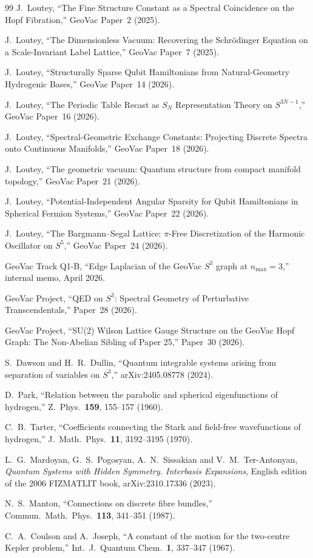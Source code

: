 \documentclass[aps,pra,twocolumn,superscriptaddress,longbibliography]{revtex4-2}
\begin{document}
\begin{thebibliography}{99}
J.~Loutey, ``The Fine Structure Constant as a Spectral Coincidence on
the Hopf Fibration,'' GeoVac Paper~2 (2025).

J.~Loutey, ``The Dimensionless Vacuum: Recovering the Schr\"odinger
Equation on a Scale-Invariant Label Lattice,'' GeoVac Paper~7 (2025).

J.~Loutey, ``Structurally Sparse Qubit Hamiltonians from Natural-Geometry
Hydrogenic Bases,'' GeoVac Paper~14 (2026).

J.~Loutey, ``The Periodic Table Recast as $S_N$ Representation Theory
on $S^{3N-1}$,'' GeoVac Paper~16 (2026).

J.~Loutey, ``Spectral-Geometric Exchange Constants: Projecting
Discrete Spectra onto Continuous Manifolds,'' GeoVac Paper~18 (2026).

J.~Loutey, ``The geometric vacuum: Quantum structure from compact
manifold topology,'' GeoVac Paper~21 (2026).

J.~Loutey, ``Potential-Independent Angular Sparsity for Qubit
Hamiltonians in Spherical Fermion Systems,'' GeoVac Paper~22 (2026).

J.~Loutey, ``The Bargmann--Segal Lattice: $\pi$-Free Discretization
of the Harmonic Oscillator on $S^5$,'' GeoVac Paper~24 (2026).

GeoVac Track Q1-B, ``Edge Laplacian of the GeoVac $S^3$ graph at
$n_{\max} = 3$,'' internal memo, April 2026.

GeoVac Project, ``QED on $S^3$: Spectral Geometry of Perturbative
Transcendentals,'' Paper~28 (2026).

GeoVac Project, ``SU(2) Wilson Lattice Gauge Structure on the GeoVac
Hopf Graph: The Non-Abelian Sibling of Paper 25,'' Paper~30 (2026).

S.~Dawson and H.~R.~Dullin, ``Quantum integrable systems arising from separation of
variables on $S^3$,'' arXiv:2405.08778 (2024).

D.~Park, ``Relation between the parabolic and spherical eigenfunctions
of hydrogen,'' Z.\ Phys.\ \textbf{159}, 155--157 (1960).

C.~B.~Tarter, ``Coefficients connecting the Stark and field-free
wavefunctions of hydrogen,'' J.\ Math.\ Phys.\ \textbf{11}, 3192--3195
(1970).

L.~G.~Mardoyan, G.~S.~Pogosyan, A.~N.~Sissakian and V.~M.~Ter-Antonyan,
\emph{Quantum Systems with Hidden Symmetry. Interbasis Expansions},
English edition of the 2006 FIZMATLIT book, arXiv:2310.17336 (2023).

N.~S.~Manton, ``Connections on discrete fibre bundles,'' Commun.\ Math.\
Phys.\ \textbf{113}, 341--351 (1987).

C.~A.~Coulson and A.~Joseph, ``A constant of the motion for the
two-centre Kepler problem,'' Int.\ J.\ Quantum Chem.\ \textbf{1},
337--347 (1967).

\end{thebibliography}
\end{document}
